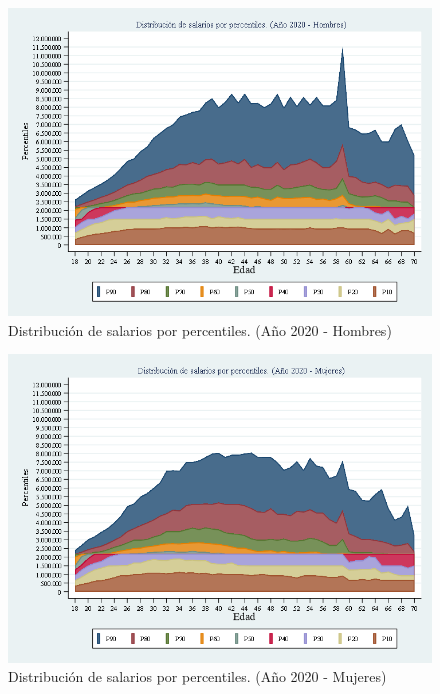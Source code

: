 \begin{figure}[H]
\begin{center}
                    \caption{Distribución de salarios por percentiles. (Año 2020 - Hombres)}
                    \vspace{0.5cm}
                    \includegraphics[scale=0.4]{RA_IPS_cotizantes_2020_sexo_edad_18a70_distsal_percentiles_hombres.png}
\end{center}
\end{figure}

\begin{figure}[H]
\begin{center}
                    \caption{Distribución de salarios por percentiles. (Año 2020 - Mujeres)}
                    \vspace{0.5cm}
                    \includegraphics[scale=0.4]{RA_IPS_cotizantes_2020_sexo_edad_18a70_distsal_percentiles_mujeres.png}
\end{center}
\end{figure}


